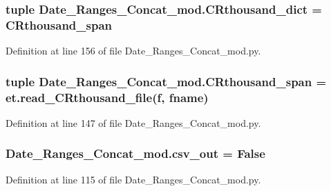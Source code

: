 \subsubsection[{C\+Rthousand\+\_\+dict}]{\setlength{\rightskip}{0pt plus 5cm}tuple Date\+\_\+\+Ranges\+\_\+\+Concat\+\_\+mod.\+C\+Rthousand\+\_\+dict = {\bf C\+Rthousand\+\_\+span}}\label{namespace_date___ranges___concat__mod_aed55c0f2337263c5b111a95e50e59ff0}


Definition at line 156 of file Date\+\_\+\+Ranges\+\_\+\+Concat\+\_\+mod.\+py.

\hypertarget{namespace_date___ranges___concat__mod_a222cab6f1387a2cfc5fda108d2d28b4c}{}
\subsubsection[{C\+Rthousand\+\_\+span}]{\setlength{\rightskip}{0pt plus 5cm}tuple Date\+\_\+\+Ranges\+\_\+\+Concat\+\_\+mod.\+C\+Rthousand\+\_\+span = et.\+read\+\_\+\+C\+Rthousand\+\_\+file({\bf f}, fname)}\label{namespace_date___ranges___concat__mod_a222cab6f1387a2cfc5fda108d2d28b4c}


Definition at line 147 of file Date\+\_\+\+Ranges\+\_\+\+Concat\+\_\+mod.\+py.

\hypertarget{namespace_date___ranges___concat__mod_a80e0c8152ed14726f95ea18921062ace}{}
\subsubsection[{csv\+\_\+out}]{\setlength{\rightskip}{0pt plus 5cm}Date\+\_\+\+Ranges\+\_\+\+Concat\+\_\+mod.\+csv\+\_\+out = False}\label{namespace_date___ranges___concat__mod_a80e0c8152ed14726f95ea18921062ace}


Definition at line 115 of file Date\+\_\+\+Ranges\+\_\+\+Concat\+\_\+mod.\+py.

\hypertarget{namespace_date___ranges___concat__mod_a6a56c00d72f298edbcea63a9dc67ce73}{}
